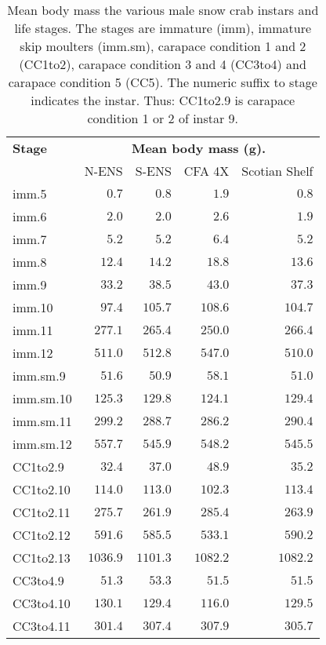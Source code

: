 \documentclass[11pt]{article}
\begin{document}
\begin{table}[!tbp]
 \caption{Mean body mass the various male snow crab instars and life stages. The stages are immature (imm), immature skip moulters (imm.sm), carapace condition 1 and 2 (CC1to2), carapace condition 3 and 4 (CC3to4) and carapace condition 5 (CC5). The numeric suffix to stage indicates the instar. Thus: CC1to2.9 is carapace condition 1 or 2 of instar 9.\label{table.mass.stages}} 
 \begin{center}
 \begin{tabular}{lrrrr}\hline\hline
\multicolumn{1}{l}{\bfseries Stage}&
\multicolumn{4}{c}{\bfseries Mean body mass (g).}
\\ \cline{2-5}
\multicolumn{1}{l}{}&
\multicolumn{1}{c}{N-ENS}&
\multicolumn{1}{c}{S-ENS}&
\multicolumn{1}{c}{CFA 4X}&
\multicolumn{1}{c}{Scotian Shelf}
\\ \hline
imm.5&$   0.7$&$   0.8$&$   1.9$&$   0.8$\\
imm.6&$   2.0$&$   2.0$&$   2.6$&$   1.9$\\
imm.7&$   5.2$&$   5.2$&$   6.4$&$   5.2$\\
imm.8&$  12.4$&$  14.2$&$  18.8$&$  13.6$\\
imm.9&$  33.2$&$  38.5$&$  43.0$&$  37.3$\\
imm.10&$  97.4$&$ 105.7$&$ 108.6$&$ 104.7$\\
imm.11&$ 277.1$&$ 265.4$&$ 250.0$&$ 266.4$\\
imm.12&$ 511.0$&$ 512.8$&$ 547.0$&$ 510.0$\\
imm.sm.9&$  51.6$&$  50.9$&$  58.1$&$  51.0$\\
imm.sm.10&$ 125.3$&$ 129.8$&$ 124.1$&$ 129.4$\\
imm.sm.11&$ 299.2$&$ 288.7$&$ 286.2$&$ 290.4$\\
imm.sm.12&$ 557.7$&$ 545.9$&$ 548.2$&$ 545.5$\\
CC1to2.9&$  32.4$&$  37.0$&$  48.9$&$  35.2$\\
CC1to2.10&$ 114.0$&$ 113.0$&$ 102.3$&$ 113.4$\\
CC1to2.11&$ 275.7$&$ 261.9$&$ 285.4$&$ 263.9$\\
CC1to2.12&$ 591.6$&$ 585.5$&$ 533.1$&$ 590.2$\\
CC1to2.13&$1036.9$&$1101.3$&$1082.2$&$1082.2$\\
CC3to4.9&$  51.3$&$  53.3$&$  51.5$&$  51.5$\\
CC3to4.10&$ 130.1$&$ 129.4$&$ 116.0$&$ 129.5$\\
CC3to4.11&$ 301.4$&$ 307.4$&$ 307.9$&$ 305.7$\\

\end{tabular}
\end{center}
\end{table}
\end{document}
